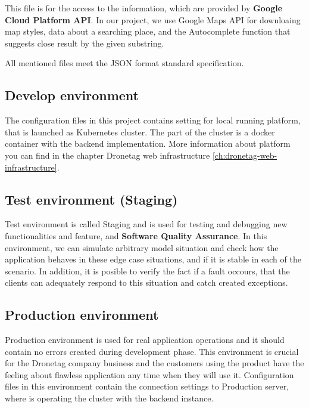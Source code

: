 This file is for the access to the information, which are provided by \textbf{Google Cloud Platform API}.
In our project, we use Google Maps API for downloaing map styles, data about a searching place, and the Autocomplete function that suggests close result by the given substring.

All mentioned files meet the JSON format standard specification.

\subsection{Develop environment}\label{subsec:develop-environment}
The configuration files in this project contains setting for local running platform, that is launched as Kubernetes cluster.
The part of the cluster is a docker container with the backend implementation.
More information about platform you can find in the chapter Dronetag web infrastructure \ref{ch:dronetag-web-infrastructure}.


\subsection{Test environment (Staging)}\label{subsec:test-environment}
Test environment is called Staging and is used for testing and debugging new functionalities and feature, and \textbf{Software Quality Assurance}.\cite{sqa}
In this environment, we can simulate arbitrary model situation and check how the application behaves in these edge case situations, and if it is stable in each of the scenario.
In addition, it is posible to verify the fact if a fault occours, that the clients can adequately respond to this situation and catch created exceptions.

\subsection{Production environment}\label{subsec:production-environment}
Production environment is used for real application operations and it should contain no errors created during development phase.
This environment is crucial for the Dronetag company business and the customers using the product have the feeling about flawless application any time when they will use it.
Configuration files in this environment contain the connection settings to Production server, where is operating the cluster with the backend instance.
